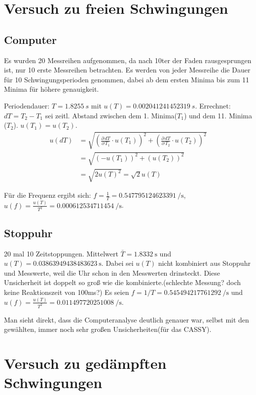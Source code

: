 \documentclass[11pt,a4paper,titlepage, ngerman]{article}
\begin{document}
	\section{Versuch zu freien Schwingungen}
		
		\subsection*{Computer}
		Es wurden 20 Messreihen aufgenommen, da nach 10ter der Faden rausgesprungen ist, nur 10 erste Messreihen betrachten.
		Es werden von jeder Messreihe die Dauer für 10 Schwingungsperioden genommen, dabei ab dem ersten Minima bis zum 11 Minima für höhere genauigkeit.
		
		Periodendauer: $T=\SI{1,8255}{s}$ mit $u(T) = \SI{0,002041241452319}{s}$.
		Errechnet: $dT = T_2 - T_1$ sei zeitl. Abstand zwischen dem 1. Minima($T_1$) und dem 11. Minima ($T_2$).
		$u(T_1) = u(T_2)$.
		\begin{align}
			u(dT) &= \sqrt{\left( \frac{\partial\,dT}{\partial\,T_1} \cdot u(T_1)\right)^2 +\left( \frac{\partial\,dT}{\partial\,T_2} \cdot u(T_2)\right)^2}\\
			&= \sqrt{(-u(T_1))^2 + (u(T_2))^2}\\
			&= \sqrt{2 u(T)^2} = \sqrt{2} u(T)
		\end{align}
		
		Für die Frequenz ergibt sich: $f=\frac{1}{T} = \SI{0,547795124623391}{\per\second}$, 
		$u(f) = \frac{u(T)}{T^2} =\SI{ 0,000612534711454}{\per\second}$.
		
		\subsection*{Stoppuhr}
		20  mal 10 Zeitstoppungen.
		Mittelwert $\bar{T} = \SI{1,8332}{\second}$ und $u(T) = \SI{0,03863949438483623}{\second}$.
		Dabei sei $u(T)$ nicht kombiniert aus Stoppuhr und Messwerte, weil die Uhr schon in den Messwerten drinsteckt.
		Diese Unsicherheit ist doppelt so groß wie die kombinierte.(schlechte Messung? doch keine Reaktionszeit von 100ms?)
		Es seien $f=1/T = \SI{0,545494217761292}{\per\second}$ und $u(f) = \frac{u(T)}{T^2}= \SI{0,011497720251008}{\per\second}$.
		
		Man sieht direkt, dass die Computeranalyse deutlich genauer war, selbst mit den gewählten, immer noch sehr großen Unsicherheiten(für das CASSY).
		
	\section{Versuch zu gedämpften Schwingungen}
		
\end{document}
